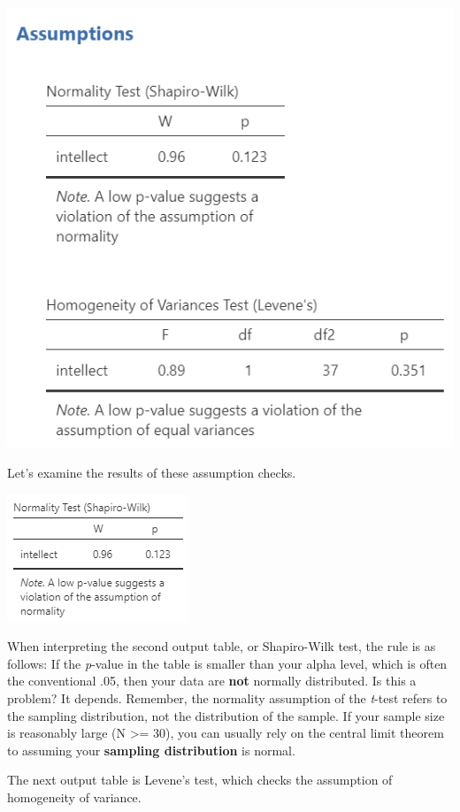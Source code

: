 \documentclass[
]{book}
\begin{document}
\includegraphics{img/AssumptionChecks.png}

Let's examine the results of these assumption checks.

\includegraphics{img/NormalityCheck.png}

When interpreting the second output table, or Shapiro-Wilk test, the rule is as follows: If the \emph{p}-value in the table is smaller than your alpha level, which is often the conventional .05, then your data are \textbf{not} normally distributed. Is this a problem? It depends. Remember, the normality assumption of the \emph{t}-test refers to the sampling distribution, not the distribution of the sample. If your sample size is reasonably large (N \textgreater= 30), you can usually rely on the central limit theorem to assuming your \textbf{sampling distribution} is normal.

The next output table is Levene's test, which checks the assumption of homogeneity of variance.
\end{document}
